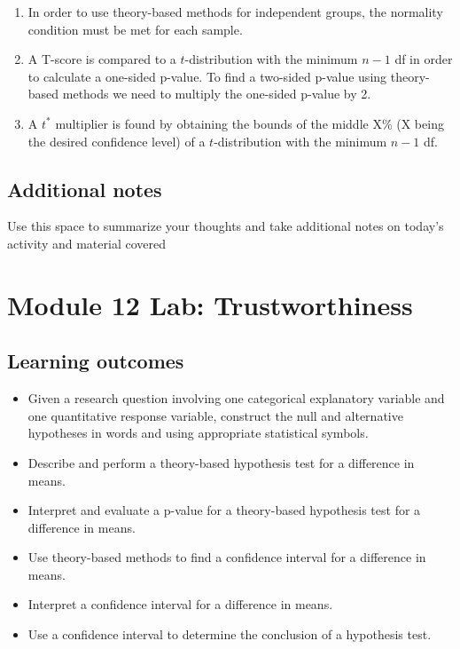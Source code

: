 \documentclass[
]{report}
\begin{document}
\begin{enumerate}
\def\labelenumi{\arabic{enumi}.}
\item
  In order to use theory-based methods for independent groups, the normality condition must be met for each sample.
\item
  A T-score is compared to a \(t\)-distribution with the minimum \(n - 1\) df in order to calculate a one-sided p-value. To find a two-sided p-value using theory-based methods we need to multiply the one-sided p-value by 2.
\item
  A \(t^*\) multiplier is found by obtaining the bounds of the middle X\% (X being the desired confidence level) of a \(t\)-distribution with the minimum \(n - 1\) df.
\end{enumerate}

\subsection{Additional notes}\label{additional-notes-24}

Use this space to summarize your thoughts and take additional notes on today's activity and material covered

\vspace{3in}
\newpage

\section{Module 12 Lab: Trustworthiness}\label{module-12-lab-trustworthiness}


\subsection{Learning outcomes}\label{learning-outcomes-29}

\begin{itemize}
\item
  Given a research question involving one categorical explanatory variable and one quantitative response variable, construct the null and alternative hypotheses
  in words and using appropriate statistical symbols.
\item
  Describe and perform a theory-based hypothesis test for a difference in means.
\item
  Interpret and evaluate a p-value for a theory-based hypothesis test for a difference in means.
\item
  Use theory-based methods to find a confidence interval for a difference in means.
\item
  Interpret a confidence interval for a difference in means.
\item
  Use a confidence interval to determine the conclusion of a hypothesis test.
\end{itemize}
\end{document}
